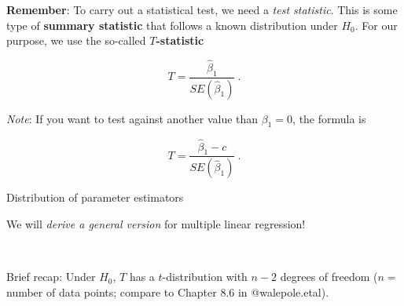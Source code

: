 \documentclass[
  10pt,
  ignorenonframetext,
]{beamer}
\begin{document}
\begin{frame}
\textbf{Remember}: To carry out a statistical test, we need a \emph{test
statistic}. This is some type of \textbf{summary statistic} that follows
a known distribution under \(H_0\). For our purpose, we use the
so-called \textbf{\(T\)-statistic}

\begin{equation*}
T=\frac{\hat\beta_1 }{SE(\hat\beta_1)}\ . 
\end{equation*}

\vspace{4mm}

\emph{Note}: If you want to test against another value than
\(\beta_1=0\), the formula is

\begin{equation*}
T=\frac{\hat\beta_1 - c}{SE(\hat\beta_1)} \ .
\end{equation*}
\end{frame}

\begin{frame}
\begin{block}{Distribution of parameter estimators}
\protect\hypertarget{distribution-of-parameter-estimators}{}
\vspace{2mm}

We will \emph{derive a general version} for multiple linear regression!

\(~\)

Brief recap: Under \(H_0\), \(T\) has a \(t\)-distribution with \(n-2\)
degrees of freedom (\(n=\) number of data points; compare to Chapter 8.6
in @walepole.etal).
\end{block}
\end{frame}
\end{document}
